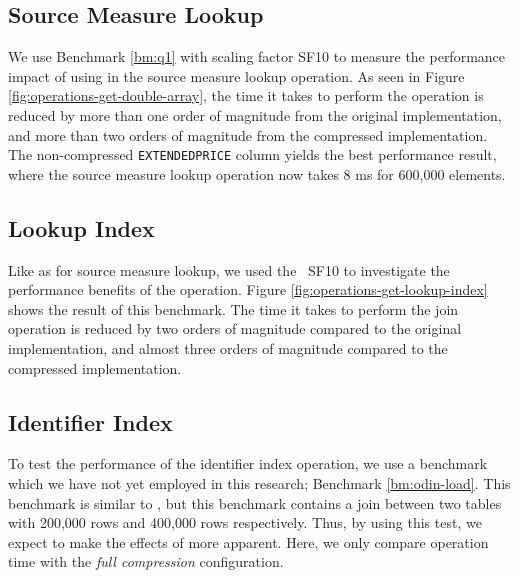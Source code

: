 \subsection{Source Measure Lookup}
\label{sub:Source Measure Lookup}

We use Benchmark \ref{bm:q1} with scaling factor SF10 to measure the performance impact of using  in the source measure lookup operation. As seen in Figure \ref{fig:operations-get-double-array}, the time it takes to perform the operation is reduced by more than one order of magnitude from the original implementation, and more than two orders of magnitude from the compressed implementation. The non-compressed \texttt{EXTENDEDPRICE} column yields the best performance result, where the source measure lookup operation now takes 8 ms for 600,000 elements.

\subsection{Lookup Index}
\label{sub:Lookup Index}


Like as for source measure lookup, we used the \tpchdl~SF10 to investigate the performance benefits of the  operation. Figure \ref{fig:operations-get-lookup-index} shows the result of this benchmark. The time it takes to perform the join operation is reduced by two orders of magnitude compared to the original implementation, and almost three orders of magnitude compared to the compressed implementation.

\subsection{Identifier Index}
\label{sub:Identifier Index}
To test the performance of the identifier index operation, we use a benchmark which we have not yet employed in this research; Benchmark \ref{bm:odin-load}. This benchmark is similar to \tpchdl, but this benchmark contains a join between two tables with 200,000 rows and 400,000 rows respectively. Thus, by using this test, we expect to make the effects of  more apparent. Here, we only compare operation time with the \textit{full compression} configuration.

